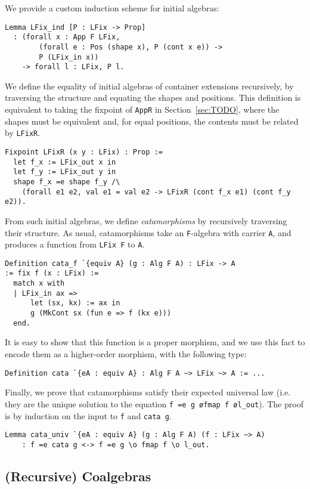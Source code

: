 \documentclass[a4paper, UKenglish, cleveref, autoref, thm-restate]{lipics-v2021}
\begin{document}
We provide a custom induction scheme for initial algebras:
\begin{verbatim}
Lemma LFix_ind [P : LFix -> Prop]
  : (forall x : App F LFix,
        (forall e : Pos (shape x), P (cont x e)) ->
        P (LFix_in x))
    -> forall l : LFix, P l.
\end{verbatim}
We define the equality of initial algebras of container extensions recursively,
by traversing the structure and equating the shapes and positions. This
definition is equivalent to taking the fixpoint of \texttt{AppR} in
Section~\ref{sec:TODO}, where the shapes must be equivalent and, for equal
positions, the contents must be related by \texttt{LFixR}.
\begin{verbatim}
Fixpoint LFixR (x y : LFix) : Prop :=
  let f_x := LFix_out x in
  let f_y := LFix_out y in
  shape f_x =e shape f_y /\
    (forall e1 e2, val e1 = val e2 -> LFixR (cont f_x e1) (cont f_y e2)).
\end{verbatim}
From such initial algebras, we define \emph{catamorphisms} by recursively
traversing their structure. As usual, catamorphisms take an
\texttt{F}-algebra with carrier \texttt{A}, and produces a
function from \texttt{LFix F} to \texttt{A}.
\begin{verbatim}
Definition cata_f `{equiv A} (g : Alg F A) : LFix -> A
:= fix f (x : LFix) :=
  match x with
  | LFix_in ax =>
      let (sx, kx) := ax in
      g (MkCont sx (fun e => f (kx e)))
  end.
\end{verbatim}
It is easy to show that this function is a proper morphism, and we use this
fact to encode them as a higher-order morphism, with the following type:
\begin{verbatim}
Definition cata `{eA : equiv A} : Alg F A ~> LFix ~> A := ...
\end{verbatim}
Finally, we prove that catamorphisms satisfy their expected universal law (i.e.
they are the unique solution to the equation \texttt{f =e g \o fmap f \o l_out}).
The proof is by induction on the input to \texttt{f} and
\texttt{cata g}.
\begin{verbatim}
Lemma cata_univ `{eA : equiv A} (g : Alg F A) (f : LFix ~> A)
    : f =e cata g <-> f =e g \o fmap f \o l_out.
\end{verbatim}

\subsection{(Recursive) Coalgebras}
\end{document}
